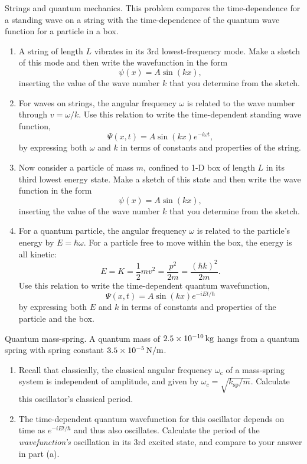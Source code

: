 \begin{aproblem}{Strings and quantum mechanics.}
  This problem compares the time-dependence for a standing wave on a
  string with the time-dependence of the quantum wave function for a
  particle in a box.
  \begin{enumerate}
  \item A string of length $L$ vibrates in its 3rd lowest-frequency
    mode.  Make a sketch of this mode and then write the wavefunction
    in the form
    \[	
    \psi(x) = A \sin (kx),
    \]
    inserting the value of the wave number $k$ that you determine from
    the sketch.

  \item For waves on strings, the angular frequency $\omega$ is
    related to the wave number through $v = \omega / k$. Use this
    relation to write the time-dependent standing wave function,
    \[
    \Psi(x,t) = A \sin (kx) e^{-i\omega t},
    \]
    by expressing both $\omega$ and $k$ in terms of constants and
    properties of the string.

  \item Now consider a particle of mass $m$, confined to 1-D box of
    length $L$ in its third lowest energy state.  Make a sketch of
    this state and then write the wave function in the form
    \[
    \psi(x) = A \sin (kx),
    \]
    inserting the value of the wave number $k$ that you determine from
    the sketch.

  \item For a quantum particle, the angular frequency $\omega$ is
    related to the particle's energy by $E=\hbar\omega$.  For a
    particle free to move within the box, the energy is all kinetic:
    \[
    E=K = \frac{1}{2}mv^2 = \frac{p^2}{2m}= \frac{(\hbar k)^2}{2m}.
    \]
    Use this relation to write the time-dependent quantum
    wavefunction,
    \[
    \Psi(x,t) = A \sin (kx) e^{-iEt/\hbar}
    \]
    by expressing both $E$ and $k$ in terms of constants and
    properties of the particle and the box.
  \end{enumerate}
\end{aproblem}

\begin{aproblem}{Quantum mass-spring.}  
  A quantum mass of $2.5 \times 10^{-10}\,\mbox{kg}$ hangs from a
  quantum spring with spring constant $3.5 \times 10^{-5}\,\mbox{N/m}$.

  \begin{enumerate}
  \item Recall that classically, the classical angular frequency
    $\omega_c$ of a mass-spring system is independent of amplitude,
    and given by $\omega_c = \sqrt{k_\text{sp}/m}$.  Calculate this
    oscillator's classical period.

  \item The time-dependent quantum wavefunction for this oscillator
    depends on time as $e^{- iEt/\hbar}$ and thus also oscillates.
    Calculate the period of the \textit{wavefunction's} oscillation in
    its 3rd excited state, and compare to your answer in part (a).
  \end{enumerate}
\end{aproblem}


